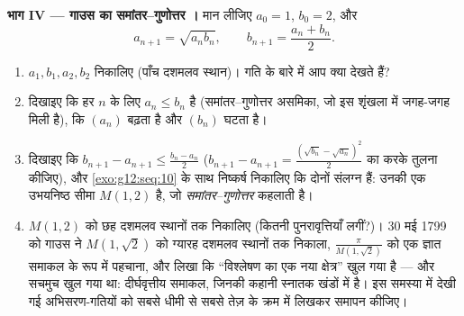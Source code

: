 \begin{problem}
\medskip
\noindent\textbf{भाग IV --- गाउस का समांतर--गुणोत्तर ।}
मान लीजिए $a_0 = 1$, $b_0 = 2$, और
\[
a_{n+1} = \sqrt{a_n b_n},
\qquad
b_{n+1} = \frac{a_n + b_n}{2} .
\]
\begin{enumerate}[resume]
  \item $a_1, b_1, a_2, b_2$ निकालिए (पाँच दशमलव स्थान)। गति के बारे में आप क्या देखते
        हैं?
  \item दिखाइए कि हर $n$ के लिए $a_n \leq b_n$ है (समांतर--गुणोत्तर असमिका, जो इस
        शृंखला में जगह-जगह मिली है), कि $(a_n)$ बढ़ता है और $(b_n)$ घटता है।
  \item दिखाइए कि
        $b_{n+1} - a_{n+1} \leq \frac{b_n - a_n}{2}$
        ($b_{n+1} - a_{n+1} =
        \frac{(\sqrt{b_n} - \sqrt{a_n})^2}{2}$ का  करके तुलना कीजिए), और \cref{exo:g12:seq:10} के साथ निष्कर्ष
        निकालिए कि दोनों  संलग्न हैं: उनकी एक उभयनिष्ठ सीमा $M(1, 2)$ है,
        जो \emph{समांतर--गुणोत्तर } कहलाती है।
  \item $M(1, 2)$ को छह दशमलव स्थानों तक निकालिए (कितनी पुनरावृत्तियाँ लगीं?)।
        30 मई 1799 को गाउस ने $M(1, \sqrt2)$ को ग्यारह दशमलव स्थानों तक निकाला, $\frac{\pi}{M(1,\sqrt2)}$
        को एक ज्ञात समाकल के रूप में पहचाना, और लिखा कि ``विश्लेषण का एक नया
        क्षेत्र'' खुल गया है --- और सचमुच खुल गया था: दीर्घवृत्तीय समाकल,
        जिनकी कहानी स्नातक खंडों में है। इस समस्या में देखी गई अभिसरण-गतियों
        को सबसे धीमी से सबसे तेज़ के क्रम में लिखकर समापन कीजिए।
\end{enumerate}
\end{problem}
